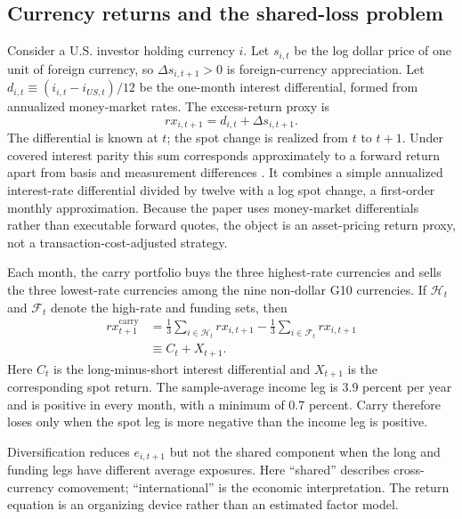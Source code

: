 \subsection{Currency returns and the shared-loss problem}

Consider a U.S. investor holding currency $i$. Let $s_{i,t}$ be the log dollar price of one unit of foreign currency, so $\Delta s_{i,t+1}>0$ is foreign-currency appreciation. Let $d_{i,t}\equiv(i_{i,t}-i_{US,t})/12$ be the one-month interest differential, formed from annualized money-market rates. The excess-return proxy is
\begin{equation}
    rx_{i,t+1}=d_{i,t}+\Delta s_{i,t+1}.
    \label{eq:currency_return}
\end{equation}
The differential is known at $t$; the spot change is realized from $t$ to $t+1$. Under covered interest parity this sum corresponds approximately to a forward return apart from basis and measurement differences \citep{du2018}. It combines a simple annualized interest-rate differential divided by twelve with a log spot change, a first-order monthly approximation. Because the paper uses money-market differentials rather than executable forward quotes, the object is an asset-pricing return proxy, not a transaction-cost-adjusted strategy.

Each month, the carry portfolio buys the three highest-rate currencies and sells the three lowest-rate currencies among the nine non-dollar G10 currencies. If $\mathcal H_t$ and $\mathcal F_t$ denote the high-rate and funding sets, then
\begin{equation}
\begin{aligned}
    rx^{\mathrm{carry}}_{t+1}
      &=\frac{1}{3}\sum_{i\in\mathcal H_t}rx_{i,t+1}
       -\frac{1}{3}\sum_{i\in\mathcal F_t}rx_{i,t+1} \\
      &\equiv C_t+X_{t+1}.
\end{aligned}
\label{eq:carry_return}
\end{equation}
Here $C_t$ is the long-minus-short interest differential and $X_{t+1}$ is the corresponding spot return. The sample-average income leg is 3.9 percent per year and is positive in every month, with a minimum of 0.7 percent. Carry therefore loses only when the spot leg is more negative than the income leg is positive.

Diversification reduces $e_{i,t+1}$ but not the shared component when the long and funding legs have different average exposures. Here ``shared'' describes cross-currency comovement; ``international'' is the economic interpretation. The return equation is an organizing device rather than an estimated factor model.

